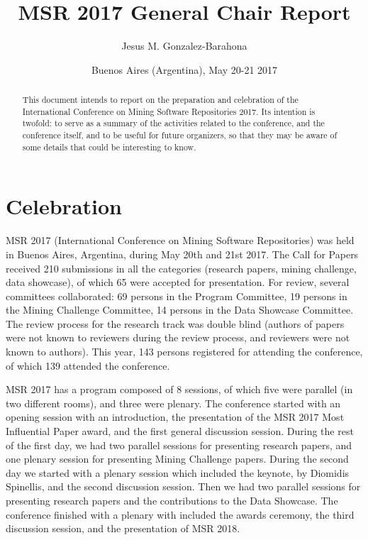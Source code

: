 \documentclass[a4paper]{report}
\title{MSR 2017 General Chair Report}
\author{Jesus M. Gonzalez-Barahona}
\date{Buenos Aires (Argentina), May 20-21 2017}
\begin{document}
\maketitle

\begin{abstract}
This document intends to report on the preparation and celebration of the International Conference on Mining Software Repositories 2017. Its intention is twofold: to serve as a summary of the activities related to the conference, and the conference itself, and to be useful for future organizers, so that they may be aware of some details that could be interesting to know.
\end{abstract}

\tableofcontents

\chapter{Celebration}

MSR 2017 (International Conference on Mining Software Repositories) was held in Buenos Aires, Argentina, during May 20th and 21st 2017. The Call for Papers received 210 submissions in all the categories (research papers, mining challenge, data showcase), of which 65 were accepted for presentation. For review, several committees collaborated: 69 persons in the Program Committee, 19 persons in the Mining Challenge Committee, 14 persons in the Data Showcase Committee. The review process for the research track was double blind (authors of papers were not known to reviewers during the review process, and reviewers were not known to authors). This year, 143 persons registered for attending the conference, of which 139 attended the conference.

MSR 2017 has a program composed of 8 sessions, of which five were parallel (in two different rooms), and three were plenary. The conference started with an opening session with an introduction, the presentation of the MSR 2017 Most Influential Paper award, and the first general discussion session. During the rest of the first day, we had two parallel sessions for presenting research papers, and one plenary session for presenting Mining Challenge papers. During the second day we started with a plenary session which included the keynote, by Diomidis Spinellis, and the second discussion session. Then we had two parallel sessions for presenting research papers and the contributions to the Data Showcase. The conference finished with a plenary with included the awards ceremony, the third discussion session, and the presentation of MSR 2018.
\end{document}
